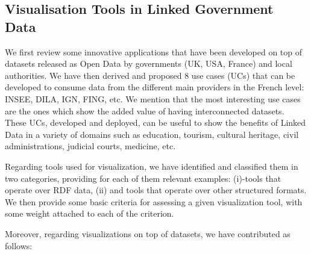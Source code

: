 \documentclass[a4paper,11pt,twoside]{report}
\begin{document}
\subsection*{Visualisation Tools in Linked Government Data} 
\label{visu}

We first review some innovative applications that have been developed on top of datasets released as Open Data by governments (UK, USA, France) and local authorities. We have then derived and proposed 8 use cases (UCs) that can be developed to consume data from the different main providers in the French level: INSEE, DILA, IGN, FING, etc. We mention that the most interesting use cases are the ones which show the added value of having interconnected datasets. These UCs,  developed and deployed, can be useful to show the benefits of Linked Data in a variety of domains such as education, tourism, cultural heritage, civil administrations, judicial courts, medicine, etc. 

Regarding tools used for visualization, we have identified and classified them in two categories, providing for each of them relevant examples: (i)-tools that operate over RDF data, (ii) and tools that operate over other structured formats. We then provide some basic criteria for assessing a given visualization tool, with some weight attached to each of the criterion. 

Moreover, regarding visualizations on top of datasets, we have contributed as follows:
\end{document}

